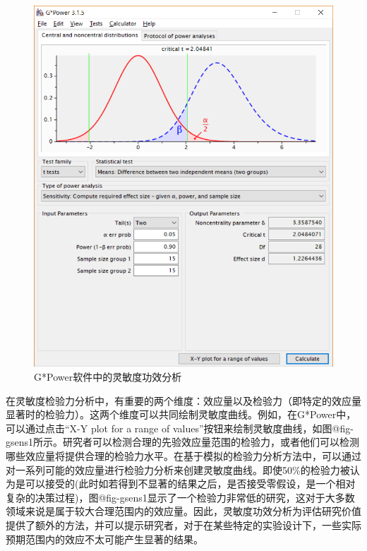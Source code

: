 \documentclass[
  letterpaper,
  DIV=11,
  numbers=noendperiod]{scrreprt}
\begin{document}
\begin{figure}

{\centering \includegraphics[width=1\textwidth,height=\textheight]{images/gpow_sensitivity_1.png}

}

\caption{\label{fig-gsens0}G*Power软件中的灵敏度功效分析}

\end{figure}

在灵敏度检验力分析中，有重要的两个维度：效应量以及检验力（即特定的效应量显著时的检验力）。这两个维度可以共同绘制灵敏度曲线。例如，在G*Power中，可以通过点击``X-Y
plot for a range of
values''按钮来绘制灵敏度曲线，如图@fig-gsens1所示。研究者可以检测合理的先验效应量范围的检验力，或者他们可以检测哪些效应量将提供合理的检验力水平。在基于模拟的检验力分析方法中，可以通过对一系列可能的效应量进行检验力分析来创建灵敏度曲线。即使50\%的检验力被认为是可以接受的(此时如若得到不显著的结果之后，是否接受零假设，是一个相对复杂的决策过程)，图@fig-gsens1显示了一个检验力非常低的研究，这对于大多数领域来说是属于较大合理范围内的效应量。因此，灵敏度功效分析为评估研究价值提供了额外的方法，并可以提示研究者，对于在某些特定的实验设计下，一些实际预期范围内的效应不太可能产生显著的结果。
\end{document}
